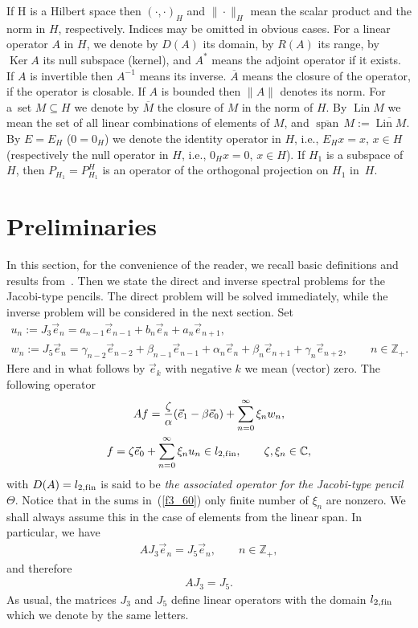 If H is a Hilbert space then $(\cdot,\cdot)_H$ and $\| \cdot \|_H$ mean the scalar product and the norm in $H$, respectively. Indices may be omitted in obvious cases. For a linear operator $A$ in $H$, we denote by $D(A)$ its domain, by $R(A)$ its range, by $\operatorname{Ker} A$ its null subspace (kernel), and $A^*$ means the adjoint operator if it exists. If $A$ is invertible then $A^{-1}$ means its inverse. $\overline{A}$ means the closure of the operator, if the operator is closable. If $A$ is bounded then $\| A \|$ denotes its norm. For a~set $M\subseteq H$ we denote by $\overline{M}$ the closure of $M$ in the norm of $H$. By $\operatorname{Lin} M$ we mean the set of all linear combinations of elements of $M$, and $\overline{\operatorname{span}}\, M := \overline{\operatorname{Lin} M}$. By $E=E_H$ ($0=0_H$) we denote the identity operator in $H$, i.e., $E_H x = x$, $x\in H$ (respectively the null operator in $H$, i.e., $0_H x = 0$, $x\in H$). If $H_1$ is a subspace of $H$, then $P_{H_1} = P_{H_1}^{H}$ is an operator of the orthogonal projection on $H_1$ in~$H$.

\section{Preliminaries}

In this section, for the convenience of the reader, we recall basic def\/initions and results from~\cite{cit_95000_Z}. Then we state the direct and inverse spectral problems for the Jacobi-type pencils. The direct problem will be solved immediately, while the inverse problem will be considered in the next section. Set
\begin{gather*}
u_n := J_3 \vec e_n = a_{n-1} \vec e_{n-1} + b_n \vec e_n + a_n \vec e_{n+1}, \\
w_n := J_5 \vec e_n = \gamma_{n-2} \vec e_{n-2} + \beta_{n-1} \vec e_{n-1} + \alpha_n \vec e_n + \beta_n \vec e_{n+1}+ \gamma_n \vec e_{n+2},\qquad n\in\mathbb{Z}_+.
\end{gather*}
Here and in what follows by $\vec e_k$ with negative $k$ we mean (vector) zero. The following operator
\begin{gather} A f = \frac{\zeta}{\alpha} (\vec e_1 - \beta \vec e_0) + \sum_{n=0}^\infty \xi_n w_n, \notag \\
f = \zeta \vec e_0 + \sum_{n=0}^\infty \xi_n u_n\in l_{2,{\rm f\/in}},\qquad \zeta, \xi_n\in\mathbb{C}, \label{f3_60}
\end{gather}
with $D(A) = l_{2,{\rm f\/in}}$ is said to be \textit{the associated operator for the Jacobi-type pencil $\Theta$}. Notice that in the sums in~(\ref{f3_60}) only f\/inite number of $\xi_n$ are nonzero. We shall always assume this in the case of elements from the linear span. In particular, we have
\begin{gather*} A J_3 \vec e_n = J_5 \vec e_n,\qquad n\in\mathbb{Z}_+, \end{gather*}
and therefore
\begin{gather*} A J_3 = J_5. \end{gather*}
As usual, the matrices $J_3$ and $J_5$ def\/ine linear operators with the domain $l_{2,{\rm f\/in}}$ which we denote by the same letters.

